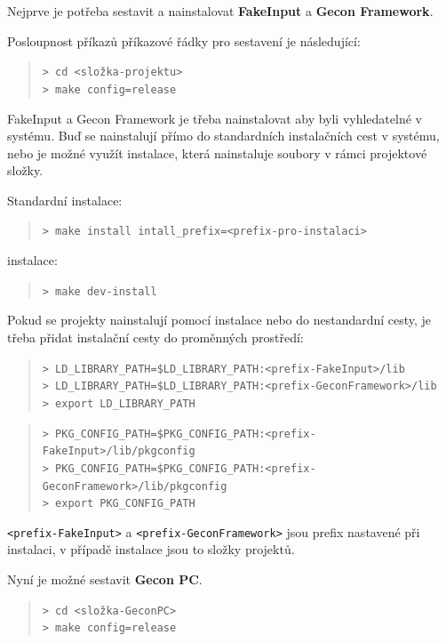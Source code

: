 \bigskip\noindent
Nejprve je potřeba sestavit a nainstalovat \textbf{FakeInput} a
\textbf{Gecon Framework}.

Posloupnost příkazů příkazové řádky pro sestavení je následující:

\begin{quote}
\texttt{> cd <složka-projektu>}\\
\texttt{> make config=release}
\end{quote}

FakeInput a Gecon Framework je třeba nainstalovat aby byli vyhledatelné v
systému. Buď se nainstalují přímo do standardních instalačních cest v systému,
nebo je možné využít  instalace, která nainstaluje soubory v
rámci projektové složky.

Standardní instalace:
\begin{quote}
\texttt{> make install intall\_prefix=<prefix-pro-instalaci>}
\end{quote}

 instalace:
\begin{quote}
\texttt{> make dev-install}
\end{quote}

Pokud se projekty nainstalují pomocí  instalace nebo do
nestandardní cesty, je třeba přidat instalační cesty do proměnných prostředí:

\begin{quote}
\small
\texttt{> LD\_LIBRARY\_PATH=\$LD\_LIBRARY\_PATH:<prefix-FakeInput>/lib}\\
\texttt{> LD\_LIBRARY\_PATH=\$LD\_LIBRARY\_PATH:<prefix-GeconFramework>/lib}\\
\texttt{> export LD\_LIBRARY\_PATH}
\end{quote}
\begin{quote}
\small
\texttt{>
    PKG\_CONFIG\_PATH=\$PKG\_CONFIG\_PATH:<prefix-FakeInput>/lib/pkgconfig}\\
\texttt{>
    PKG\_CONFIG\_PATH=\$PKG\_CONFIG\_PATH:<prefix-GeconFramework>/lib/pkgconfig}\\
\texttt{> export PKG\_CONFIG\_PATH}
\end{quote}

\texttt{<prefix-FakeInput>} a \texttt{<prefix-GeconFramework>} jsou prefix
nastavené při instalaci, v případě  instalace jsou to složky
projektů.

\bigskip
Nyní je možné sestavit \textbf{Gecon PC}.
\begin{quote}
\texttt{> cd <složka-GeconPC>}\\
\texttt{> make config=release}
\end{quote}

